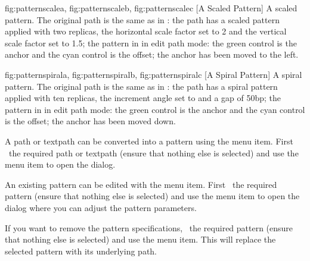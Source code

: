 {
  {fig:patternscalea}{}{},
  {fig:patternscaleb}{}{},
  {fig:patternscalec}{}{}
}
[A Scaled Pattern]
{A scaled pattern. The original path is the same as in
:
 the path has a scaled pattern applied with two replicas, 
the horizontal scale factor set to 2 and the vertical scale factor 
set to 1.5;
 the pattern 
in  in edit path mode: the green control is
the anchor and the cyan control is the offset;
 the anchor has been moved to the left.}

{
  {fig:patternspirala}{}{},
  {fig:patternspiralb}{}{},
  {fig:patternspiralc}{}{}
}
[A Spiral Pattern]
{A spiral pattern. The original path is the same as in
:
 the path has a
spiral pattern applied with ten replicas, the increment angle set
to  and a gap of 50bp; 
 the pattern 
in  in edit path mode: the green control is
the anchor and the cyan control is the offset;
 the anchor has been moved down.}


A \gls{path} or \gls{textpath} can be converted into a pattern using
the  menu item. First \select\ the
required \gls{path} or \gls{textpath} (ensure that nothing else is
selected) and use the  menu item to open
the  dialog.


An existing \gls{pattern} can be edited with the 
menu item. First \select\ the required pattern (ensure that nothing else is
selected) and use the  menu item to open
the  dialog where you can adjust the pattern
parameters.


If you want to remove the pattern specifications, \select\ the
required pattern (ensure that nothing else is selected) and use the
 menu item.  This will replace the
selected \gls{pattern} with its underlying path.

